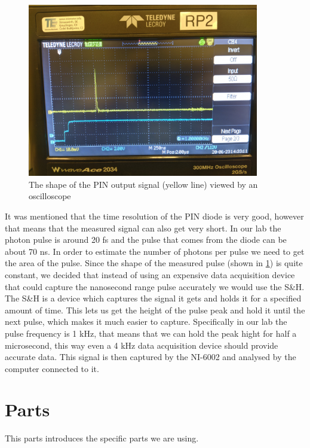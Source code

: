 \documentclass[a4paper, 10pt]{article}
\begin{document}
\begin{figure}[h]
    \centering
    \includegraphics[width=0.9\textwidth]{./images/pulse-shape.jpg}
    \caption{The shape of the PIN output signal (yellow line) viewed by an oscilloscope}
    \label{fig:pulse-shape}
\end{figure}

It was mentioned that the time resolution of the PIN diode is very good, however that means that the measured signal can also get very short.
In our lab the photon pulse is around 20 \si{\femto\second} and the pulse that comes from the diode can be about 70 \si{\nano\second}.
In order to estimate the number of photons per pulse we need to get the area of the pulse.
Since the shape of the measured pulse (shown in \cref{fig:pulse-shape}) is quite constant, we decided that instead of using an expensive data acquisition device that could capture the nanosecond range pulse accurately we would use the S\&H.
The S\&H is a device which captures the signal it gets and holds it for a specified amount of time.
This lets us get the height of the pulse peak and hold it until the next pulse, which makes it much easier to capture.
Specifically in our lab the pulse frequency is 1 \si{\kilo\hertz}, that means that we can hold the peak hight for half a microsecond, this way even a 4 \si{\kilo\hertz} data acquisition device should provide accurate data.
This signal is then captured by the NI-6002 and analysed by the computer connected to it.


\section{Parts}
This parts introduces the specific parts we are using.
\end{document}
